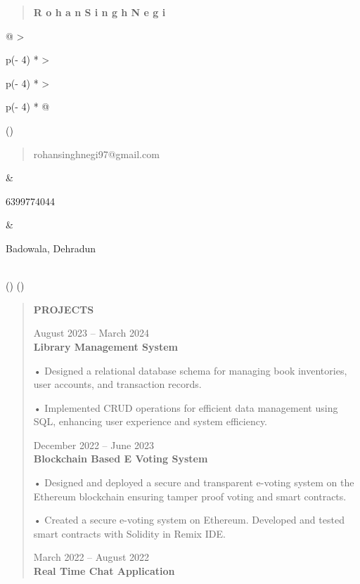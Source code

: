 \documentclass[
]{article}
\author{}
\date{}
\begin{document}
\begin{quote}
\textbf{R o h a n S i n g h N e g i}
\end{quote}

\begin{longtable}[]{@{}
  >{\raggedright\arraybackslash}p{(\columnwidth - 4\tabcolsep) * }
  >{\raggedright\arraybackslash}p{(\columnwidth - 4\tabcolsep) * }
  >{\raggedright\arraybackslash}p{(\columnwidth - 4\tabcolsep) * }@{}}
\toprule()
\begin{minipage}[b]{\linewidth}\raggedright
\begin{quote}
rohansinghnegi97@gmail.com
\end{quote}
\end{minipage} & \begin{minipage}[b]{\linewidth}\raggedright
6399774044
\end{minipage} & \begin{minipage}[b]{\linewidth}\raggedright
Badowala, Dehradun
\end{minipage} \\
\midrule()
\endhead
\bottomrule()
\end{longtable}

\begin{quote}
\textbf{PROJECTS}

August 2023 -- March 2024\\
\textbf{Library Management System}

• Designed a relational database schema for managing book inventories,
user accounts, and transaction records.

• Implemented CRUD operations for efficient data management using SQL,
enhancing user experience and system efficiency.

December 2022 -- June 2023\\
\textbf{Blockchain Based E Voting System}

• Designed and deployed a secure and transparent e-voting system on the
Ethereum blockchain ensuring tamper proof voting and smart contracts.

• Created a secure e-voting system on Ethereum. Developed and tested
smart contracts with Solidity in Remix IDE.

March 2022 -- August 2022\\
\textbf{Real Time Chat Application}
\end{quote}
\end{document}
